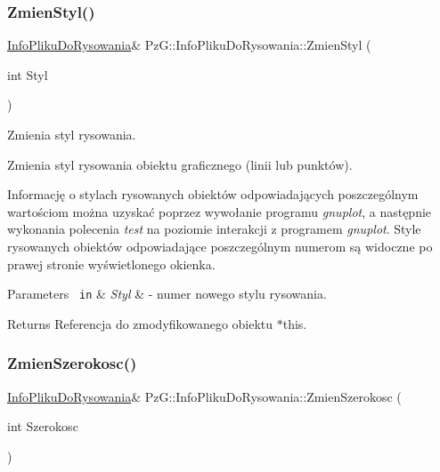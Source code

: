 \subsubsection{\texorpdfstring{ZmienStyl()}{ZmienStyl()}}
{\footnotesize\ttfamily \mbox{\hyperlink{class_pz_g_1_1_info_pliku_do_rysowania}{Info\+Pliku\+Do\+Rysowania}}\& Pz\+G\+::\+Info\+Pliku\+Do\+Rysowania\+::\+Zmien\+Styl (\begin{DoxyParamCaption}\item[{int}]{Styl }\end{DoxyParamCaption})\hspace{0.3cm}{\ttfamily [inline]}}



Zmienia styl rysowania. 

Zmienia styl rysowania obiektu graficznego (linii lub punktów).

Informację o stylach rysowanych obiektów odpowiadających poszczególnym wartościom można uzyskać poprzez wywołanie programu {\itshape gnuplot}, a następnie wykonania polecenia {\itshape test} na poziomie interakcji z programem {\itshape gnuplot}. Style rysowanych obiektów odpowiadające poszczególnym numerom są widoczne po prawej stronie wyświetlonego okienka. 
\begin{DoxyParams}[1]{Parameters}
\mbox{\texttt{ in}}  & {\em Styl} & -\/ numer nowego stylu rysowania. \\
\hline
\end{DoxyParams}
\begin{DoxyReturn}{Returns}
Referencja do zmodyfikowanego obiektu {\ttfamily $\ast$this}. 
\end{DoxyReturn}
\mbox{\label{class_pz_g_1_1_info_pliku_do_rysowania_aa6d4c0fa70db640fde80091aefa1326c}} 
\subsubsection{\texorpdfstring{ZmienSzerokosc()}{ZmienSzerokosc()}}
{\footnotesize\ttfamily \mbox{\hyperlink{class_pz_g_1_1_info_pliku_do_rysowania}{Info\+Pliku\+Do\+Rysowania}}\& Pz\+G\+::\+Info\+Pliku\+Do\+Rysowania\+::\+Zmien\+Szerokosc (\begin{DoxyParamCaption}\item[{int}]{Szerokosc }\end{DoxyParamCaption})\hspace{0.3cm}{\ttfamily [inline]}}



